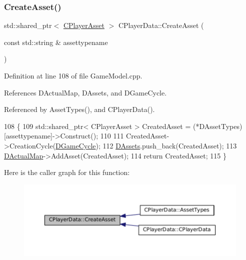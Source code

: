 \subsubsection{\texorpdfstring{Create\+Asset()}{CreateAsset()}}
{\footnotesize\ttfamily std\+::shared\+\_\+ptr$<$ \hyperlink{classCPlayerAsset}{C\+Player\+Asset} $>$ C\+Player\+Data\+::\+Create\+Asset (\begin{DoxyParamCaption}\item[{const std\+::string \&}]{assettypename }\end{DoxyParamCaption})}



Definition at line 108 of file Game\+Model.\+cpp.



References D\+Actual\+Map, D\+Assets, and D\+Game\+Cycle.



Referenced by Asset\+Types(), and C\+Player\+Data().


\begin{DoxyCode}
108                                                                                     \{
109     std::shared\_ptr< CPlayerAsset > CreatedAsset = (*DAssetTypes)[assettypename]->Construct();
110     
111     CreatedAsset->CreationCycle(\hyperlink{classCPlayerData_ae92ca06a63a01681dd9f3ddc17c0e106}{DGameCycle});
112     \hyperlink{classCPlayerData_a1d7dd355facf52db6242e3554373906c}{DAssets}.push\_back(CreatedAsset);
113     \hyperlink{classCPlayerData_a943801106af1d7ad52abd73d32552186}{DActualMap}->AddAsset(CreatedAsset);
114     \textcolor{keywordflow}{return} CreatedAsset;
115 \}
\end{DoxyCode}
Here is the caller graph for this function\+:\nopagebreak
\begin{figure}[H]
\begin{center}
\leavevmode
\includegraphics[width=350pt]{classCPlayerData_a4d203da2adbd6d00b0cd5b334bddba4f_icgraph}
\end{center}
\end{figure}
\hypertarget{classCPlayerData_a4ef7c98c3b0f28354a2bccc2782b57ad}{}\label{classCPlayerData_a4ef7c98c3b0f28354a2bccc2782b57ad} 
